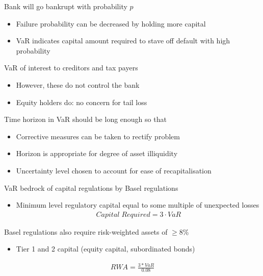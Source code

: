 \documentclass{beamer}
\begin{document}
\begin{frame}
  Bank will go bankrupt with probability $p$
  \begin{itemize}
    \item Failure probability can be decreased by holding more capital
    \item VaR indicates capital amount required to stave off default with high probability
  \end{itemize}
  \medskip
  VaR of interest to creditors and tax payers
  \begin{itemize}
    \item However, these do not control the bank
    \item Equity holders do: no concern for tail loss 
  \end{itemize}  
\end{frame}

\begin{frame}
  Time horizon in VaR should be long enough so that
  \begin{itemize}
    \item Corrective measures can be taken to rectify problem
    \item Horizon is appropriate for degree of asset illiquidity
    \item Uncertainty level chosen to account for ease of recapitalisation
  \end{itemize}
\end{frame}


\begin{frame}
 VaR bedrock of capital regulations by Basel regulations
  \begin{itemize}
    \item Minimum level regulatory capital equal to some multiple of unexpected losses
    \begin{align*}
      Capital\; Required = 3\cdot VaR
    \end{align*}
  \end{itemize}
   Basel regulations also require risk-weighted assets of $\geq$8\%
   \begin{itemize}
     \item Tier 1 and 2 capital (equity capital, subordinated bonds)
   \end{itemize}
\begin{align*} 
  RWA=\frac{3*VaR}{0.08} 
\end{align*}
\end{frame}
\end{document}
